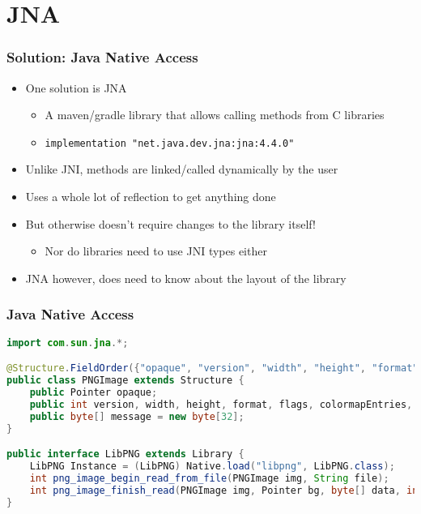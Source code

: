 \documentclass[10pt,mathserif]{beamer}
\begin{document}
	\section{JNA}

	\begin{frame}
		\frametitle{Solution: Java Native Access}

		\begin{itemize}
			\item One solution is JNA
			\begin{itemize}
				\item A maven/gradle library that allows calling methods from C libraries
				\item \lstinline{implementation "net.java.dev.jna:jna:4.4.0"}
			\end{itemize}
			\item Unlike JNI, methods are linked/called dynamically by the user
			\item Uses a whole lot of reflection to get anything done
			\item But otherwise doesn't require changes to the library itself!
			\begin{itemize}
				\item Nor do libraries need to use JNI types either
			\end{itemize}
			\item JNA however, does need to know about the layout of the library
		\end{itemize}
	\end{frame}

	\begin{frame}[fragile]
		\frametitle{Java Native Access}
			\begin{lstlisting}[language=java]
import com.sun.jna.*;

@Structure.FieldOrder({"opaque", "version", "width", "height", "format", "flags", "colormapEntries", "warningOrError", "message"})
public class PNGImage extends Structure {
	public Pointer opaque;
	public int version, width, height, format, flags, colormapEntries, warningOrError;
	public byte[] message = new byte[32];
}

public interface LibPNG extends Library {
	LibPNG Instance = (LibPNG) Native.load("libpng", LibPNG.class);
	int png_image_begin_read_from_file(PNGImage img, String file);
	int png_image_finish_read(PNGImage img, Pointer bg, byte[] data, int rowStride, Pointer colormap);
}
		\end{lstlisting}
	\end{frame}
\end{document}

